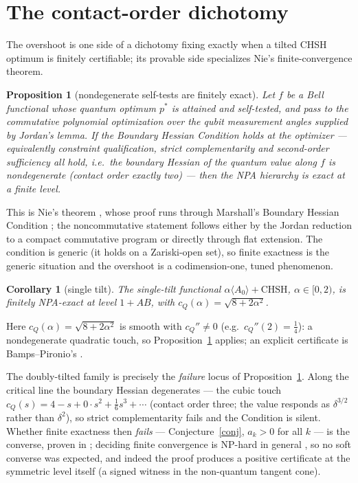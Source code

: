 \documentclass[11pt]{article}
\newtheorem{proposition}[theorem]{Proposition}
\newtheorem{corollary}[theorem]{Corollary}
\begin{document}
\section{The contact-order dichotomy}\label{sec:contact}

The overshoot is one side of a dichotomy fixing exactly when a tilted CHSH
optimum is finitely certifiable; its provable side specializes Nie's
finite-convergence theorem.

\begin{proposition}[nondegenerate self-tests are finitely exact]\label{prop:bhc}
Let $f$ be a Bell functional whose quantum optimum $p^*$ is attained and
self-tested, and pass to the commutative polynomial optimization over the qubit
measurement angles supplied by Jordan's lemma. If the \emph{Boundary Hessian
Condition} holds at the optimizer --- equivalently constraint qualification,
strict complementarity and second-order sufficiency all hold, i.e.\ the boundary
Hessian of the quantum value along $f$ is nondegenerate (contact order exactly
two) --- then the NPA hierarchy is exact at a finite level.
\end{proposition}

This is Nie's theorem \cite{Nie}, whose proof runs through Marshall's Boundary
Hessian Condition \cite{Marshall}; the noncommutative statement follows either
by the Jordan reduction to a compact commutative program or directly through
flat extension. The condition is generic (it holds on a Zariski-open set), so
finite exactness is the generic situation and the overshoot is a
codimension-one, tuned phenomenon.

\begin{corollary}[single tilt]\label{cor:single}
The single-tilt functional $\alpha\langle A_0\rangle+\mathrm{CHSH}$,
$\alpha\in[0,2)$, is finitely NPA-exact at level $1{+}AB$, with
$c_Q(\alpha)=\sqrt{8+2\alpha^2}$.
\end{corollary}

Here $c_Q(\alpha)=\sqrt{8+2\alpha^2}$ is smooth with $c_Q''\ne0$ (e.g.\
$c_Q''(2)=\tfrac14$): a nondegenerate quadratic touch, so
Proposition~\ref{prop:bhc} applies; an explicit certificate is
Bamps--Pironio's \cite{BampsPironio}.

The doubly-tilted family is precisely the \emph{failure} locus of
Proposition~\ref{prop:bhc}. Along the critical line the boundary Hessian
degenerates --- the cubic touch $c_Q(s)=4-s+0\cdot s^2+\tfrac16 s^3+\cdots$
(contact order three; the value responds as $\delta^{3/2}$ rather than
$\delta^2$), so strict complementarity fails and the Condition is silent.
Whether finite exactness then \emph{fails} --- Conjecture~\ref{conj}, $a_k>0$
for all $k$ --- is the converse, proven in \cite{proof}; deciding finite
convergence is NP-hard in general \cite{hardness}, so no soft converse was
expected, and indeed the proof produces a positive certificate at the symmetric
level itself (a signed witness in the non-quantum tangent cone).
\end{document}
